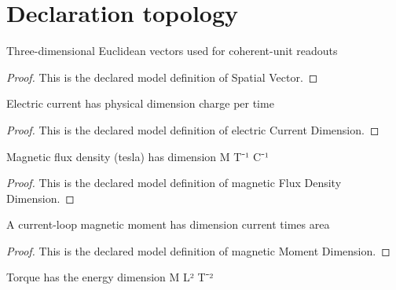 \section{Declaration topology}
\begin{definition}
  \label{def:physics:phyx-mini-0947:phyxminiproblems-problemphyxmini0947-spatialvector}
  Three-dimensional Euclidean vectors used for coherent-unit readouts
\end{definition}
\begin{proof}
  This is the declared model definition of Spatial Vector.
\end{proof}
\begin{definition}
  \label{def:physics:phyx-mini-0947:phyxminiproblems-problemphyxmini0947-electriccurrentdimension}
  Electric current has physical dimension charge per time
\end{definition}
\begin{proof}
  This is the declared model definition of electric Current Dimension.
\end{proof}
\begin{definition}
  \label{def:physics:phyx-mini-0947:phyxminiproblems-problemphyxmini0947-magneticfluxdensitydimension}
  Magnetic flux density (tesla) has dimension M T⁻¹ C⁻¹
\end{definition}
\begin{proof}
  This is the declared model definition of magnetic Flux Density Dimension.
\end{proof}
\begin{definition}
  \label{def:physics:phyx-mini-0947:phyxminiproblems-problemphyxmini0947-magneticmomentdimension}
  A current-loop magnetic moment has dimension current times area
\end{definition}
\begin{proof}
  This is the declared model definition of magnetic Moment Dimension.
\end{proof}
\begin{definition}
  \label{def:physics:phyx-mini-0947:phyxminiproblems-problemphyxmini0947-torquedimension}
  Torque has the energy dimension M L² T⁻²
\end{definition}

